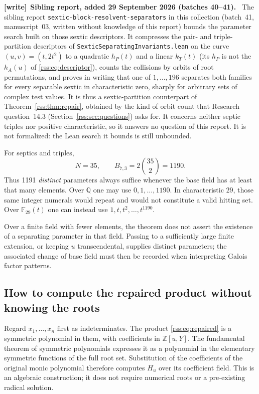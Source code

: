 \documentclass[11pt,a4paper]{article}
\theoremstyle{definition}
\theoremstyle{remark}
\newcommand{\Q}{\mathbb Q}
\newcommand{\Z}{\mathbb Z}
\newcommand{\F}{\mathbb F}
\newcommand{\code}[1]{{\small\nolinkurl{#1}}}
\newenvironment{writenote}[1][]{\par\smallskip\begingroup\small
 \noindent\textbf{[write]}\if\relax\detokenize{#1}\relax\else~\textbf{#1.}\fi\ }%
 {\par\endgroup\smallskip}
\newcommand{\repo}[1]{\code{#1}}
\begin{document}
\begin{writenote}[Sibling report, added 29 September 2026 (batches 40--41)]
The sibling report \code{sextic-block-resolvent-separators} in this
collection (batch~41, manuscript~03, written without knowledge of this
report) bounds the parameter search built on those sextic descriptors.
It compresses the pair- and triple-partition descriptors of
\repo{SexticSeparatingInvariants.lean} on the curve $(u,v)=(t,2t^2)$ to a
quadratic $h_P(t)$ and a linear $k_T(t)$ (its $h_P$ is not the $h_A(u)$ of
\eqref{rss:eq:descriptor}), counts the collisions by orbits of root
permutations, and proves in writing that one of $1,\ldots,196$ separates
both families for every separable sextic in characteristic zero, sharply
for arbitrary sets of complex test values. It is thus a sextic-partition
counterpart of Theorem~\ref{rss:thm:repair}, obtained by the kind of orbit
count that Research question~14.3 (Section~\ref{rss:sec:questions}) asks
for. It concerns neither septic triples nor positive characteristic, so it
answers no question of this report. It is not formalized: the Lean search
it bounds is still unbounded.
\end{writenote}

For septics and triples,
\[
 N=35,\qquad B_{7,3}=2\binom{35}{2}=1190.
\]
Thus 1191 \emph{distinct} parameters always suffice whenever the base field
has at least that many elements. Over $\Q$ one may use $0,1,\ldots,1190$.
In characteristic $29$, those same integer numerals would repeat and would
not constitute a valid hitting set. Over $\F_{29}(t)$ one can instead use
$1,t,t^2,\ldots,t^{1190}$.

Over a finite field with fewer elements, the theorem does not assert the
existence of a separating parameter in that field. Passing to a sufficiently
large finite extension, or keeping $u$ transcendental, supplies distinct
parameters; the associated change of base field must then be recorded when
interpreting Galois factor patterns.

\subsection{How to compute the repaired product without knowing the roots}

Regard $x_1,\ldots,x_n$ first as indeterminates. The product
\eqref{rss:eq:repaired} is a symmetric polynomial in them, with coefficients
in $\Z[u,Y]$. The fundamental theorem of symmetric polynomials expresses
it as a polynomial in the elementary symmetric functions of the full root
set. Substitution of the coefficients of the original monic polynomial
therefore computes $H_u$ over its coefficient field. This is an algebraic
construction; it does not require numerical roots or a pre-existing
radical solution.
\end{document}
